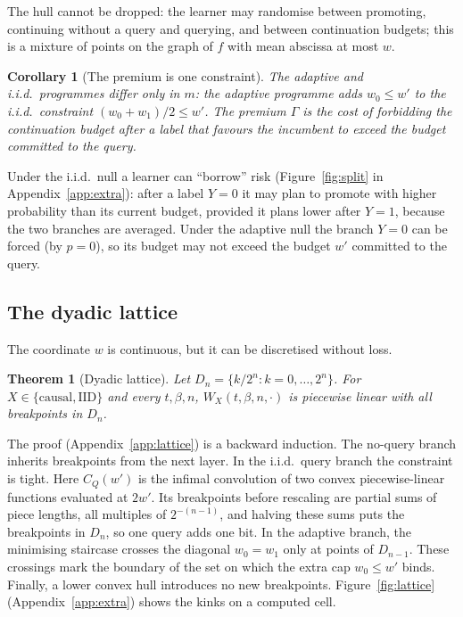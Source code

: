 \documentclass{article}
\theoremstyle{plain}
\newtheorem{theorem}{Theorem}
\newtheorem{corollary}{Corollary}
\theoremstyle{definition}
\theoremstyle{remark}
\begin{document}
The hull cannot be dropped: the learner may randomise between promoting, continuing without a query and querying, and between continuation budgets; this is a mixture of points on the graph of $f$ with mean abscissa at most $w$.

\begin{corollary}[The premium is one constraint]
\label{cor:oneconstraint}
The adaptive and i.i.d.\ programmes differ only in $m$: the adaptive programme adds $w_0\le w'$ to the i.i.d.\ constraint $(w_0+w_1)/2\le w'$. The premium $\Gamma$ is the cost of forbidding the continuation budget after a label that favours the incumbent to exceed the budget committed to the query.
\end{corollary}

Under the i.i.d.\ null a learner can ``borrow'' risk (Figure~\ref{fig:split} in Appendix~\ref{app:extra}): after a label $Y=0$ it may plan to promote with higher probability than its current budget, provided it plans lower after $Y=1$, because the two branches are averaged. Under the adaptive null the branch $Y=0$ can be forced (by $p=0$), so its budget may not exceed the budget $w'$ committed to the query.


\subsection{The dyadic lattice}

The coordinate $w$ is continuous, but it can be discretised without loss.

\begin{theorem}[Dyadic lattice]
\label{thm:lattice}
Let $D_n=\{k/2^n:k=0,\dots,2^n\}$. For $X\in\{\mathrm{causal},\mathrm{IID}\}$ and every $t,\beta,n$, $W_X(t,\beta,n,\cdot)$ is piecewise linear with all breakpoints in $D_n$.
\end{theorem}

The proof (Appendix~\ref{app:lattice}) is a backward induction. The no-query branch inherits breakpoints from the next layer. In the i.i.d.\ query branch the constraint is tight. Here $C_Q(w')$ is the infimal convolution of two convex piecewise-linear functions evaluated at $2w'$. Its breakpoints before rescaling are partial sums of piece lengths, all multiples of $2^{-(n-1)}$, and halving these sums puts the breakpoints in $D_n$, so one query adds one bit. In the adaptive branch, the minimising staircase crosses the diagonal $w_0=w_1$ only at points of $D_{n-1}$. These crossings mark the boundary of the set on which the extra cap $w_0\le w'$ binds. Finally, a lower convex hull introduces no new breakpoints. Figure~\ref{fig:lattice} (Appendix~\ref{app:extra}) shows the kinks on a computed cell.
\end{document}
